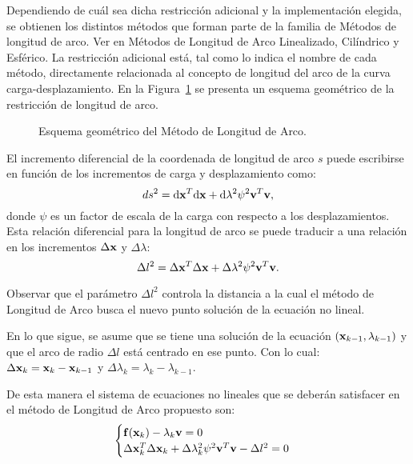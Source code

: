 Dependiendo de cuál sea dicha restricción adicional y la implementación elegida, se obtienen los distintos métodos que forman parte de la familia de Métodos de longitud de arco. Ver en \citep{crisfield1996non} Métodos de Longitud de Arco Linealizado, Cilíndrico y Esférico. %
%
La restricción adicional está, tal como lo indica el nombre de cada método, directamente relacionada al concepto de longitud del arco de la curva carga-desplazamiento. %
%
En la Figura~\ref{fig:fig5} se presenta un esquema geométrico de la restricción de longitud de arco. %


\begin{figure}[htb]
	\centering
   \def\svgwidth{0.65\textwidth}

	\caption{Esquema geométrico del Método de Longitud de Arco.}
	\label{fig:fig5}
\end{figure}

El incremento diferencial de la coordenada de longitud de arco $s$ puede escribirse en función de los incrementos de carga y desplazamiento como:
%
\begin{equation}
	ds^2 = {\text{d}}{\bf x}^T{\text{d}}{\bf x}+{\text{d}}\lambda^2 \psi^2 {\bf v}^T{\bf v},
\end{equation}
%
donde $\psi$ es un factor de escala de la carga con respecto a los desplazamientos. %
%
Esta relación diferencial para la longitud de arco se puede traducir a una relación en los incrementos $\Delta {\bf x}$ y $\Delta \lambda$:
%
\begin{equation}\label{ec11}
\Delta l^2 = \Delta {\bf x}^T \Delta {\bf x}+\Delta \lambda^2 \psi^2 {\bf v}^T{\bf v}.
\end{equation}

Observar que el parámetro $\Delta l^2$ controla la distancia a la cual el método de Longitud de Arco busca el nuevo punto solución de la ecuación no lineal.

En lo que sigue, se asume que se tiene una solución de la ecuación $\left({\bf x}_{k-1},\lambda_{k-1}\right)$ y que el arco de radio $\Delta l$ está centrado en ese punto. Con lo cual: $\Delta {\bf x}_k = {\bf x}_k - {\bf x}_{k-1} $ y $\Delta \lambda_k = \lambda_k - \lambda_{k-1}$.

De esta manera el sistema de ecuaciones no lineales que se deberán satisfacer en el método de Longitud de Arco propuesto son:
%
\begin{equation}\label{ec12}
\begin{cases} 
{\bf f}({\bf x}_k) - \lambda_k {\bf v} = 0\\
\Delta {\bf x}_k^T \Delta {\bf x}_k+\Delta \lambda_k^2 \psi^2 {\bf v}^T{\bf v} - \Delta l^2 = 0 \\
\end{cases}
\end{equation}

